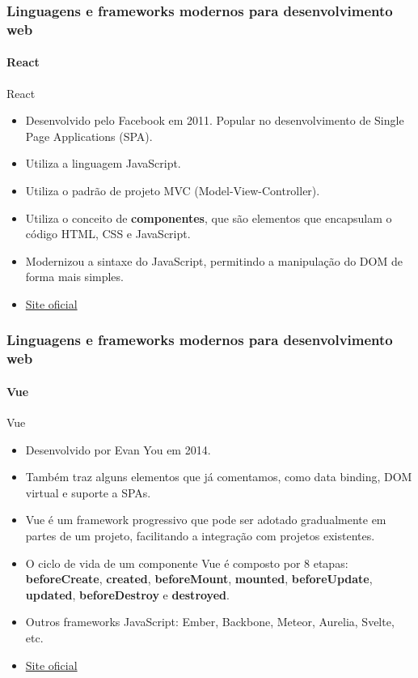 \documentclass[
	9pt, %
	t, %
]{beamer}
\newcommand{\iconLink}[2]{\href{#1}{\faLink \hspace{0.2em} {#2}}}
\begin{document}
\begin{frame}
	\frametitle{Linguagens e frameworks modernos para desenvolvimento web}
	\framesubtitle{React}

	\begin{block}{React}
		\begin{itemize}
			\item Desenvolvido pelo Facebook em 2011. Popular no desenvolvimento de Single Page Applications (SPA).
			\item Utiliza a linguagem JavaScript.
			\item Utiliza o padrão de projeto MVC (Model-View-Controller).
			\item Utiliza o conceito de \textbf{componentes}, que são elementos que encapsulam o código HTML, CSS e JavaScript.
			\item Modernizou a sintaxe do JavaScript, permitindo a manipulação do DOM de forma mais simples.
			\item \iconLink{https://react.dev}{Site oficial}
		\end{itemize}
	\end{block}
\end{frame}

\begin{frame}
	\frametitle{Linguagens e frameworks modernos para desenvolvimento web}
	\framesubtitle{Vue}

	\begin{block}{Vue}
		\begin{itemize}
			\item Desenvolvido por Evan You em 2014. 
			\item Também traz alguns elementos que já comentamos, como data binding, DOM virtual e suporte a SPAs. 
			\item Vue é um framework progressivo que pode ser adotado gradualmente em partes de um projeto, facilitando a integração com projetos existentes.
			\item O ciclo de vida de um componente Vue é composto por 8 etapas: \textbf{beforeCreate}, \textbf{created}, \textbf{beforeMount}, \textbf{mounted}, \textbf{beforeUpdate}, \textbf{updated}, \textbf{beforeDestroy} e \textbf{destroyed}.
			\item Outros frameworks JavaScript: Ember, Backbone, Meteor, Aurelia, Svelte, etc.
			\item \iconLink{https://vuejs.org/}{Site oficial}
		\end{itemize}
	\end{block}

\end{frame}
\end{document}
